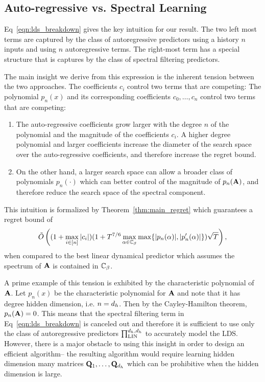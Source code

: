 \subsection{Auto-regressive vs. Spectral Learning}

Eq~\eqref{eqn:lds_breakdown} gives the key intuition for our result. The two left most terms are captured by the class of autoregressive predictors using a history $n$ inputs and using $n$ autoregressive terms. The right-most term has a special structure that is captures by the class of spectral filtering predictors. 

The main insight we derive from this expression is the inherent tension between the two approaches. The coefficients $c_i$ control two terms that are competing: The polynomial $p_n(x)$ and its corresponding coefficients $c_0, \dots, c_n$ control two terms that are competing:
\begin{enumerate}
    \item The auto-regressive coefficients grow larger with the degree $n$ of the polynomial and the magnitude of the coefficients $c_i$. A higher degree polynomial and larger coefficients increase the diameter of the search space over the auto-regressive coefficients, and therefore increase the regret bound. 

    \item On the other hand, a larger search space can allow a broader class of polynomials $p_n(\cdot)$ which can better control of the magnitude of $p_n(\mathbf{A})$, and therefore reduce the search space of the spectral component. 
\end{enumerate}
This intuition is formalized by Theorem~\ref{thm:main_regret} which guarantees a regret bound of 
$$ \tilde{O} \left(  (1 + \max_{i \in [n]} |c_i|) (1 + T^{7/6} \max_{\alpha \in \mathbb{C}_\beta} \max \{ |p_n(\alpha)|, |p_n'(\alpha)| \}) \sqrt{T}\right), $$
when compared to the best linear dynamical predictor which assumes the spectrum of $\mathbf{A}$ is contained in $\mathbb{C}_\beta$. 

A prime example of this tension is exhibited by the characteristic polynomial of $\mathbf{A}$. Let $p_n(x)$ be the characteristic polynomial for $\mathbf{A}$ and note that it has degree hidden dimension, i.e. $n =  d_h$. Then by the Cayley-Hamilton theorem, $ p_n(\mathbf{A}) = 0$.
This means that the spectral filtering term in Eq~\eqref{eqn:lds_breakdown} is canceled out and therefore it is sufficient to use only the class of autoregressive predictors $\prod_{\textrm{LIN}}^{d_h,d_h}$ to accurately model the LDS. However, there is a major obstacle to using this insight in order to design an efficient algorithm-- the resulting algorithm would require learning hidden dimension many matrices $\mathbf{Q}_1, \dots, \mathbf{Q}_{d_h}$ which can be prohibitive when the hidden dimension is large.

